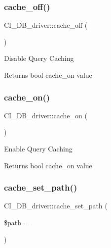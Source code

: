 \subsubsection{\texorpdfstring{cache\+\_\+off()}{cache\_off()}}
{\footnotesize\ttfamily C\+I\+\_\+\+D\+B\+\_\+driver\+::cache\+\_\+off (\begin{DoxyParamCaption}{ }\end{DoxyParamCaption})}

Disable Query Caching

\begin{DoxyReturn}{Returns}
bool cache\+\_\+on value 
\end{DoxyReturn}
\mbox{\label{class_c_i___d_b__driver_ac3840253abd6fb039225ee9aeea64269}} 
\subsubsection{\texorpdfstring{cache\+\_\+on()}{cache\_on()}}
{\footnotesize\ttfamily C\+I\+\_\+\+D\+B\+\_\+driver\+::cache\+\_\+on (\begin{DoxyParamCaption}{ }\end{DoxyParamCaption})}

Enable Query Caching

\begin{DoxyReturn}{Returns}
bool cache\+\_\+on value 
\end{DoxyReturn}
\mbox{\label{class_c_i___d_b__driver_a6638f718383c9d3c5f4bfbd6fdb24c31}} 
\subsubsection{\texorpdfstring{cache\+\_\+set\+\_\+path()}{cache\_set\_path()}}
{\footnotesize\ttfamily C\+I\+\_\+\+D\+B\+\_\+driver\+::cache\+\_\+set\+\_\+path (\begin{DoxyParamCaption}\item[{}]{\$path = {\ttfamily \textquotesingle{}\textquotesingle{}} }\end{DoxyParamCaption})}


